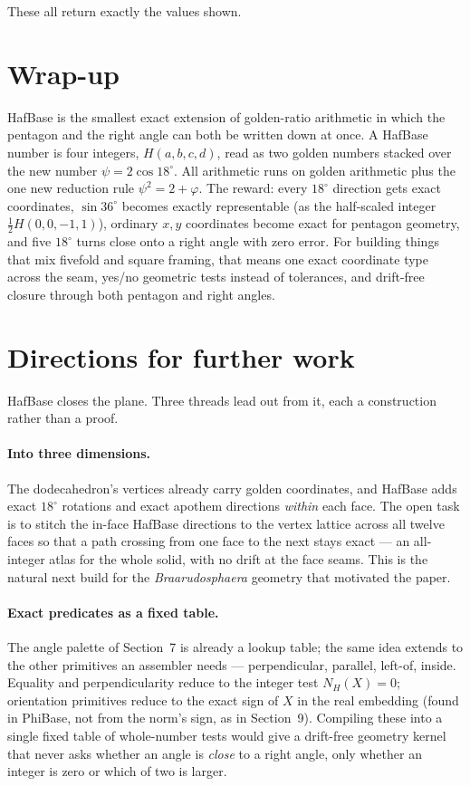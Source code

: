 \documentclass[11pt]{article}
\newcommand{\phigr}{\varphi}
\newcommand{\Hn}[4]{H(#1,#2,#3,#4)}
\begin{document}
These all return exactly the values shown.

\section{Wrap-up}

HafBase is the smallest exact extension of golden-ratio arithmetic in which the pentagon and the
right angle can both be written down at once. A HafBase number is four integers, $\Hn{a}{b}{c}{d}$,
read as two golden numbers stacked over the new number $\psi = 2\cos 18^\circ$. All arithmetic runs
on golden arithmetic plus the one new reduction rule $\psi^2 = 2 + \phigr$. The reward: every $18^\circ$
direction gets exact coordinates, $\sin 36^\circ$ becomes exactly representable (as the half-scaled
integer $\tfrac12\Hn{0}{0}{-1}{1}$), ordinary $x,y$
coordinates become exact for pentagon geometry, and five $18^\circ$ turns close onto a right angle
with zero error. For building things that mix fivefold and square framing, that means one exact
coordinate type across the seam, yes/no geometric tests instead of tolerances, and drift-free closure
through both pentagon and right angles.

\clearpage
\section{Directions for further work}

HafBase closes the plane. Three threads lead out from it, each a construction rather than a proof.

\paragraph{Into three dimensions.} The dodecahedron's vertices already carry golden coordinates, and
HafBase adds exact $18^\circ$ rotations and exact apothem directions \emph{within} each face. The open
task is to stitch the in-face HafBase directions to the vertex lattice across all twelve faces so that a
path crossing from one face to the next stays exact --- an all-integer atlas for the whole solid, with no
drift at the face seams. This is the natural next build for the \emph{Braarudosphaera} geometry that
motivated the paper.

\paragraph{Exact predicates as a fixed table.} The angle palette of Section~7 is already a lookup table;
the same idea extends to the other primitives an assembler needs --- perpendicular, parallel, left-of,
inside. Equality and perpendicularity reduce to the integer test $N_H(X) = 0$; orientation primitives
reduce to the exact sign of $X$ in the real embedding (found in PhiBase, not from the norm's sign, as in
Section~9). Compiling these into a single fixed table of
whole-number tests would give a drift-free geometry kernel that never asks whether an angle is
\emph{close} to a right angle, only whether an integer is zero or which of two is larger.
\end{document}
